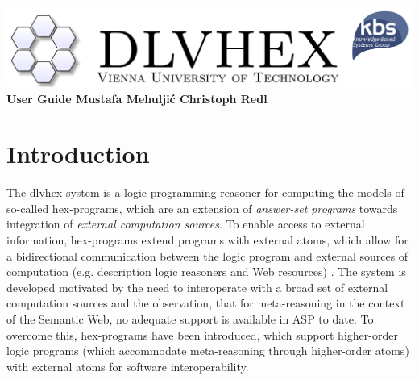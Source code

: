 \documentclass[a4paper, titlepage]{article}
\begin{document}
\setcounter{page}{3}
\newcommand{\dlvhex}{{\sc dlvhex}}
\newcommand{\hex}{{\sc hex}}
\setcounter{secnumdepth}{4} %
\setcounter{tocdepth}{4}    %

\newtheorem{exmp}{Example}[section]


\begin{titlepage}
    \centering
    \vfill
    \includegraphics[scale=1.2]{biglogo_whitebg}
    \vfill
    {\bfseries\Large
        User Guide
        \vskip4cm
        Mustafa Mehulji\'{c} \vskip1cm Christoph Redl
    }    
    
\end{titlepage}

\begin{abstract}
This document provides a user guide for the Answer Set 
Programming (ASP) system called \dlvhex{} developed at 
Vienna University of Technology. ASP is a declarative 
problem solving paradigm, rooted in logic programming and 
nonmonotonic reasoning, which has been gaining increasing 
attention during the last years. The \dlvhex{} system is a 
reasoner for computing the models of so-called \hex{}-programs, which are an extension of \emph{answer-set 
programs} towards integration of \emph{external computation 
sources}. This guide aims at enabling users of this system 
to interoperate with a broad set of external computation 
sources. The guide refers to release 2.4.     
\end{abstract}

\tableofcontents
\newpage

\section{Introduction} %
\label{sec:intro}
The \dlvhex{} system is a logic-programming reasoner for 
computing the models of so-called \hex{}-programs, which 
are an extension of \emph{answer-set programs} towards 
integration of \emph{external computation sources}. To 
enable access to external information, \hex{}-programs 
extend programs with external atoms, which allow for a 
bidirectional communication between the logic program and 
external sources of computation (e.g. description logic 
reasoners and Web resources) \cite{extatoms}. The system is 
developed motivated by the need to interoperate with a 
broad set of external computation sources and the 
observation, that for meta-reasoning in the context of the 
Semantic Web, no adequate support is available in ASP to 
date. To overcome this, \hex{}-programs have been 
introduced, which support higher-order logic programs 
(which accommodate meta-reasoning through higher-order 
atoms) with external atoms for software interoperability.
\end{document}
